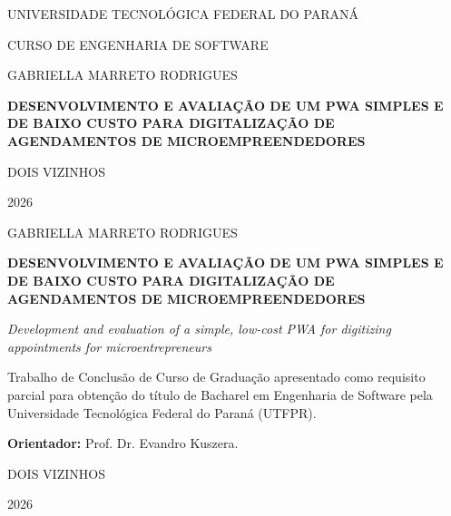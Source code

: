 \documentclass[12pt,a4paper]{article}
\newcommand{\autor}{Gabriella Marreto Rodrigues}
\newcommand{\titulo}{Desenvolvimento e avaliação de um PWA simples e de baixo custo para digitalização de agendamentos de microempreendedores}
\newcommand{\tituloingles}{Development and evaluation of a simple, low-cost PWA for digitizing appointments for microentrepreneurs}
\newcommand{\instituicao}{Universidade Tecnológica Federal do Paraná}
\newcommand{\curso}{Engenharia de Software}
\newcommand{\orientador}{Prof. Dr. Evandro Kuszera}
\newcommand{\cidade}{Dois Vizinhos}
\newcommand{\ano}{2026}
\begin{document}
\sloppy

\begin{titlepage}
    \centering
    {\large\MakeUppercase{\instituicao}\par}
    {\large CURSO DE \MakeUppercase{\curso}\par}
    \vspace{3.2cm}
    {\large\MakeUppercase{\autor}\par}
    \vfill
    {\bfseries\Large\MakeUppercase{\titulo}\par}
    \vfill
    {\large\MakeUppercase{\cidade}\par}
    {\large\ano\par}
\end{titlepage}

\begin{titlepage}
    \centering
    {\large\MakeUppercase{\autor}\par}
    \vspace{3cm}
    {\bfseries\Large\MakeUppercase{\titulo}\par}
    \vspace{0.5cm}
    {\itshape\tituloingles\par}
    \vspace{2.5cm}
    \begin{flushright}
        \begin{minipage}{0.52\textwidth}
        Trabalho de Conclusão de Curso de Graduação apresentado como requisito parcial para obtenção do título de Bacharel em Engenharia de Software pela Universidade Tecnológica Federal do Paraná (UTFPR).

        \vspace{0.5cm}
        \textbf{Orientador:} \orientador.
        \end{minipage}
    \end{flushright}
    \vfill
    {\large\MakeUppercase{\cidade}\par}
    {\large\ano\par}
\end{titlepage}
\end{document}
